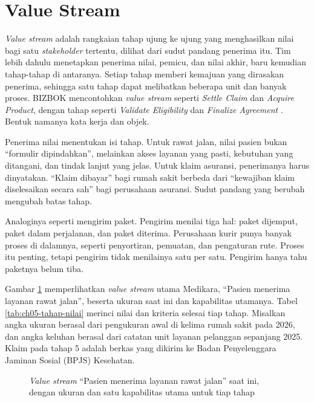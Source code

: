 \section{Value Stream}

\textit{Value stream} adalah rangkaian tahap ujung ke ujung yang menghasilkan nilai bagi satu
\textit{stakeholder} tertentu, dilihat dari sudut pandang penerima itu. Tim lebih dahulu
menetapkan penerima nilai, pemicu, dan nilai akhir, baru kemudian tahap-tahap di antaranya.
Setiap tahap memberi kemajuan yang dirasakan penerima, sehingga satu tahap dapat melibatkan
beberapa unit dan banyak proses. BIZBOK mencontohkan \textit{value stream} seperti
\textit{Settle Claim} dan \textit{Acquire Product}, dengan tahap seperti \textit{Validate
Eligibility} dan \textit{Finalize Agreement} \cite{bizbok15}. Bentuk namanya kata kerja dan
objek.

Penerima nilai menentukan isi tahap. Untuk rawat jalan, nilai pasien bukan ``formulir
dipindahkan'', melainkan akses layanan yang pasti, kebutuhan yang ditangani, dan tindak lanjut
yang jelas. Untuk klaim asuransi, penerimanya harus dinyatakan. ``Klaim dibayar'' bagi rumah
sakit berbeda dari ``kewajiban klaim diselesaikan secara sah'' bagi perusahaan asuransi.
Sudut pandang yang berubah mengubah batas tahap.

Analoginya seperti mengirim paket. Pengirim menilai tiga hal: paket dijemput, paket dalam
perjalanan, dan paket diterima. Perusahaan kurir punya banyak proses di dalamnya, seperti
penyortiran, pemuatan, dan pengaturan rute. Proses itu penting, tetapi pengirim tidak
menilainya satu per satu. Pengirim hanya tahu paketnya belum tiba.

Gambar \ref{fig:ch05-value-stream} memperlihatkan \textit{value stream} utama Medikara,
``Pasien menerima layanan rawat jalan'', beserta ukuran saat ini dan kapabilitas utamanya.
Tabel \ref{tab:ch05-tahap-nilai} merinci nilai dan kriteria selesai tiap tahap. Misalkan
angka ukuran berasal dari pengukuran awal di kelima rumah sakit pada 2026, dan angka keluhan
berasal dari catatan unit layanan pelanggan sepanjang 2025. Klaim pada tahap 5 adalah berkas
yang dikirim ke Badan Penyelenggara Jaminan Sosial (BPJS) Kesehatan.

\begin{figure}[!htb]
  \centering
  
  \caption{\textit{Value stream} ``Pasien menerima layanan rawat jalan'' saat ini, dengan
           ukuran dan satu kapabilitas utama untuk tiap tahap}
  \label{fig:ch05-value-stream}
\end{figure}

